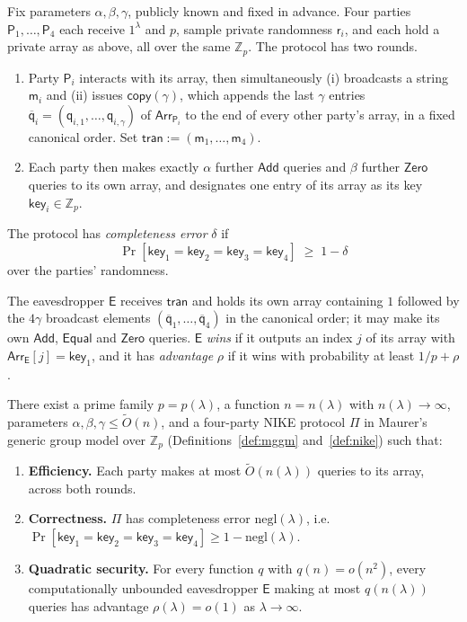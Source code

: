 \documentclass{conjura-conjecture}
\newcommand{\Zp}{\mathbb{Z}_{p}}
\newcommand{\Add}{\mathsf{Add}}
\newcommand{\Zero}{\mathsf{Zero}}
\newcommand{\Equal}{\mathsf{Equal}}
\newcommand{\copyq}{\mathsf{copy}}
\newcommand{\Arr}{\mathsf{Arr}}
\newcommand{\Pty}{\mathsf{P}}
\newcommand{\Ev}{\mathsf{E}}
\newcommand{\tran}{\mathsf{tran}}
\newcommand{\keyv}{\mathsf{key}}
\newcommand{\rv}{\mathsf{r}}
\newcommand{\mv}{\mathsf{m}}
\newcommand{\qv}{\mathsf{q}}
\newcommand{\negl}{\mathrm{negl}}
\begin{document}
\begin{definition}\label{def:nike}
Fix parameters $\alpha, \beta, \gamma$, publicly known and fixed in
advance. Four parties $\Pty_{1},\dots,\Pty_{4}$ each receive $1^{\lambda}$
and $p$, sample private randomness $\rv_{i}$, and each hold a private
array as above, all over the same $\Zp$. The protocol has two rounds.
\begin{enumerate}
  \item Party $\Pty_{i}$ interacts with its array, then simultaneously
    (i) broadcasts a string $\mv_{i}$ and (ii) issues $\copyq(\gamma)$,
    which appends the last $\gamma$ entries
    $\overline{\qv}_{i} = (\qv_{i,1},\dots,\qv_{i,\gamma})$ of
    $\Arr_{\Pty_{i}}$ to the end of every other party's array, in a fixed
    canonical order. Set $\tran := (\mv_{1},\dots,\mv_{4})$.
  \item Each party then makes exactly $\alpha$ further $\Add$ queries and
    $\beta$ further $\Zero$ queries to its own array, and designates one
    entry of its array as its key $\keyv_{i} \in \Zp$.
\end{enumerate}
The protocol has \emph{completeness error} $\delta$ if
\[
  \Pr[\keyv_{1} = \keyv_{2} = \keyv_{3} = \keyv_{4}] \;\ge\; 1 - \delta
\]
over the parties' randomness.

The eavesdropper $\Ev$ receives $\tran$ and holds its own array
containing $1$ followed by the $4\gamma$ broadcast elements
$(\overline{\qv}_{1},\dots,\overline{\qv}_{4})$ in the canonical order;
it may make its own $\Add$, $\Equal$ and $\Zero$ queries. $\Ev$
\emph{wins} if it outputs an index $j$ of its array with
$\Arr_{\Ev}[j] = \keyv_{1}$, and it has \emph{advantage} $\rho$ if it
wins with probability at least $1/p + \rho$.
\end{definition}

\begin{conjecture}\label{conj:main}
There exist a prime family $p = p(\lambda)$, a function $n = n(\lambda)$
with $n(\lambda) \to \infty$, parameters
$\alpha, \beta, \gamma \le \tilde{O}(n)$, and a four-party NIKE protocol
$\Pi$ in Maurer's generic group model over $\Zp$
(Definitions~\ref{def:mggm} and~\ref{def:nike}) such that:
\begin{enumerate}
  \item \textbf{Efficiency.} Each party makes at most
    $\tilde{O}(n(\lambda))$ queries to its array, across both rounds.
  \item \textbf{Correctness.} $\Pi$ has completeness error
    $\negl(\lambda)$, i.e.
    $\Pr[\keyv_{1} = \keyv_{2} = \keyv_{3} = \keyv_{4}]
    \ge 1 - \negl(\lambda)$.
  \item \textbf{Quadratic security.} For every function $q$ with
    $q(n) = o(n^{2})$, every computationally unbounded eavesdropper
    $\Ev$ making at most $q(n(\lambda))$ queries has advantage
    $\rho(\lambda) = o(1)$ as $\lambda \to \infty$.
\end{enumerate}
\end{conjecture}
\end{document}
